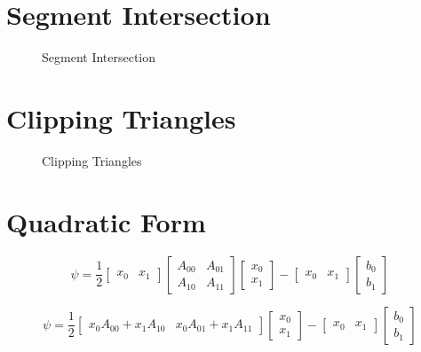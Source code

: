 




\section*{Segment Intersection}

\begin{figure}[H]
\centering

\caption{Segment Intersection}
\label{fig:intersection}
\end{figure}

\section*{Clipping Triangles}

\begin{figure}[H]
\centering



\caption{Clipping Triangles}
\label{fig:triangles}
\end{figure}

\section*{Quadratic Form}

\[
\psi = \frac12
\begin{bmatrix}
x_0 & x_1
\end{bmatrix}
\begin{bmatrix}
A_{00} & A_{01} \\
A_{10} & A_{11}
\end{bmatrix}
\begin{bmatrix}
x_0 \\
x_1
\end{bmatrix}
-
\begin{bmatrix}
x_0 & x_1
\end{bmatrix}
\begin{bmatrix}
b_0 \\
b_1
\end{bmatrix}
\]

\[
\psi = \frac12
\begin{bmatrix}
x_0A_{00} + x_1A_{10} & x_0A_{01} + x_1A_{11}
\end{bmatrix}
\begin{bmatrix}
x_0 \\
x_1
\end{bmatrix}
-
\begin{bmatrix}
x_0 & x_1
\end{bmatrix}
\begin{bmatrix}
b_0 \\
b_1
\end{bmatrix}
\]

